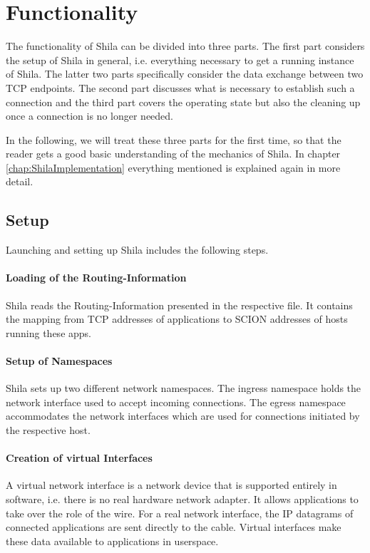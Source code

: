 \newpage
\section{Functionality}
\label{sec:ShilaFunctionality}

The functionality of Shila can be divided into three parts. The first part considers the setup of Shila in general, i.e. everything necessary to get a running instance of Shila. The latter two parts specifically consider the data exchange between two TCP endpoints. The second part discusses what is necessary to establish such a connection and the third part covers the operating state but also the cleaning up once a connection is no longer needed. 

In the following, we will treat these three parts for the first time, so that the reader gets a good basic understanding of the mechanics of Shila. In chapter \ref{chap:ShilaImplementation} everything mentioned is explained again in more detail.

\subsection{Setup}
\label{subsec:ShilaSetup}

Launching and setting up Shila includes the following steps.

\paragraph{Loading of the Routing-Information} Shila reads the Routing-Information presented in the respective file. It contains the mapping from TCP addresses of applications to SCION addresses of hosts running these apps. 

\paragraph{Setup of Namespaces} Shila sets up two different network namespaces. The ingress namespace holds the network interface used to accept incoming connections. The egress namespace accommodates the network interfaces which are used for connections initiated by the respective host.

\paragraph{Creation of virtual Interfaces} A virtual network interface is a network device that is supported entirely in software, i.e. there is no real hardware network adapter. It allows applications to take over the role of the wire. For a real network interface, the IP datagrams of connected applications are sent directly to the cable. Virtual interfaces make these data available to applications in userspace.

